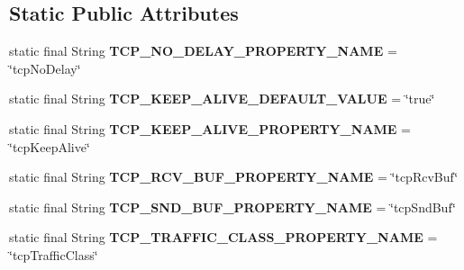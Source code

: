 \subsection*{Static Public Attributes}
\begin{DoxyCompactItemize}
\item 
\mbox{\label{classcom_1_1mysql_1_1jdbc_1_1_standard_socket_factory_a83f0139fdce8eb0558552bb131cc9ebd}} 
static final String {\bfseries T\+C\+P\+\_\+\+N\+O\+\_\+\+D\+E\+L\+A\+Y\+\_\+\+P\+R\+O\+P\+E\+R\+T\+Y\+\_\+\+N\+A\+ME} = \char`\"{}tcp\+No\+Delay\char`\"{}
\item 
\mbox{\label{classcom_1_1mysql_1_1jdbc_1_1_standard_socket_factory_a38a7ca1cf77ed1449cd6e40e8e31bf97}} 
static final String {\bfseries T\+C\+P\+\_\+\+K\+E\+E\+P\+\_\+\+A\+L\+I\+V\+E\+\_\+\+D\+E\+F\+A\+U\+L\+T\+\_\+\+V\+A\+L\+UE} = \char`\"{}true\char`\"{}
\item 
\mbox{\label{classcom_1_1mysql_1_1jdbc_1_1_standard_socket_factory_a4f8ce994e46a59c7463a1162f108bc70}} 
static final String {\bfseries T\+C\+P\+\_\+\+K\+E\+E\+P\+\_\+\+A\+L\+I\+V\+E\+\_\+\+P\+R\+O\+P\+E\+R\+T\+Y\+\_\+\+N\+A\+ME} = \char`\"{}tcp\+Keep\+Alive\char`\"{}
\item 
\mbox{\label{classcom_1_1mysql_1_1jdbc_1_1_standard_socket_factory_a040e72e04921d4f30d19153838451a19}} 
static final String {\bfseries T\+C\+P\+\_\+\+R\+C\+V\+\_\+\+B\+U\+F\+\_\+\+P\+R\+O\+P\+E\+R\+T\+Y\+\_\+\+N\+A\+ME} = \char`\"{}tcp\+Rcv\+Buf\char`\"{}
\item 
\mbox{\label{classcom_1_1mysql_1_1jdbc_1_1_standard_socket_factory_a3cde6687109dbdeb19e6f567c780d3a4}} 
static final String {\bfseries T\+C\+P\+\_\+\+S\+N\+D\+\_\+\+B\+U\+F\+\_\+\+P\+R\+O\+P\+E\+R\+T\+Y\+\_\+\+N\+A\+ME} = \char`\"{}tcp\+Snd\+Buf\char`\"{}
\item 
\mbox{\label{classcom_1_1mysql_1_1jdbc_1_1_standard_socket_factory_a7c3245085d6938f5db648ba7d5cf8734}} 
static final String {\bfseries T\+C\+P\+\_\+\+T\+R\+A\+F\+F\+I\+C\+\_\+\+C\+L\+A\+S\+S\+\_\+\+P\+R\+O\+P\+E\+R\+T\+Y\+\_\+\+N\+A\+ME} = \char`\"{}tcp\+Traffic\+Class\char`\"{}

\end{DoxyCompactItemize}
